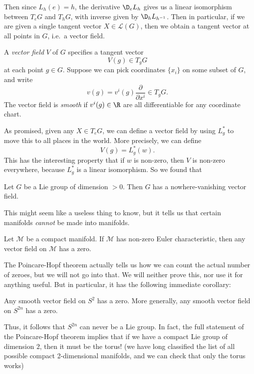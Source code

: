 \documentclass[a4paper]{article}
\begin{document}
Then since $L_h(e) = h$, the derivative $\D_e L_h$ gives us a linear isomorphism between $T_e G$ and $T_h G$, with inverse given by $\D_h L_{h^{-1}}$. Then in particular, if we are given a single tangent vector $X \in \mathcal{L}(G)$, then we obtain a tangent vector at all points in $G$, i.e.\ a vector field.

\begin{defi}
  A \emph{vector field} $V$ of $G$ specifies a tangent vector
  \[
    V(g) \in T_gG
  \]
  at each point $g \in G$. Suppose we can pick coordinates $\{x_i\}$ on some subset of $G$, and write
  \[
    v(g) = v^i (g) \frac{\partial}{\partial x^i} \in T_g G.
  \]
  The vector field is \emph{smooth} if $v^i(g) \in \R$ are all differentiable for any coordinate chart.
\end{defi}

As promised, given any $X \in T_eG$, we can define a vector field by using $L_g^*$ to move this to all places in the world. More precisely, we can define
\[
  V(g) = L_g^*(w).
\]
This has the interesting property that if $w$ is non-zero, then $V$ is non-zero everywhere, because $L_g^*$ is a linear isomorphism. So we found that

\begin{prop}
  Let $G$ be a Lie group of dimension $> 0$. Then $G$ has a nowhere-vanishing vector field.
\end{prop}
This might seem like a useless thing to know, but it tells us that certain manifolds \emph{cannot} be made into manifolds.

\begin{thm}
  Let $\mathcal{M}$ be a compact manifold. If $\mathcal{M}$ has non-zero Euler characteristic, then any vector field on $\mathcal{M}$ has a zero.
\end{thm}
The Poincare-Hopf theorem actually tells us how we can count the actual number of zeroes, but we will not go into that. We will neither prove this, nor use it for anything useful. But in particular, it has the following immediate corollary:
\begin{thm}
  Any smooth vector field on $S^2$ has a zero. More generally, any smooth vector field on $S^{2n}$ has a zero.
\end{thm}
Thus, it follows that $S^{2n}$ can never be a Lie group. In fact, the full statement of the Poincare-Hopf theorem implies that if we have a compact Lie group of dimension $2$, then it must be the torus! (we have long classified the list of all possible compact 2-dimensional manifolds, and we can check that only the torus works)
\end{document}
